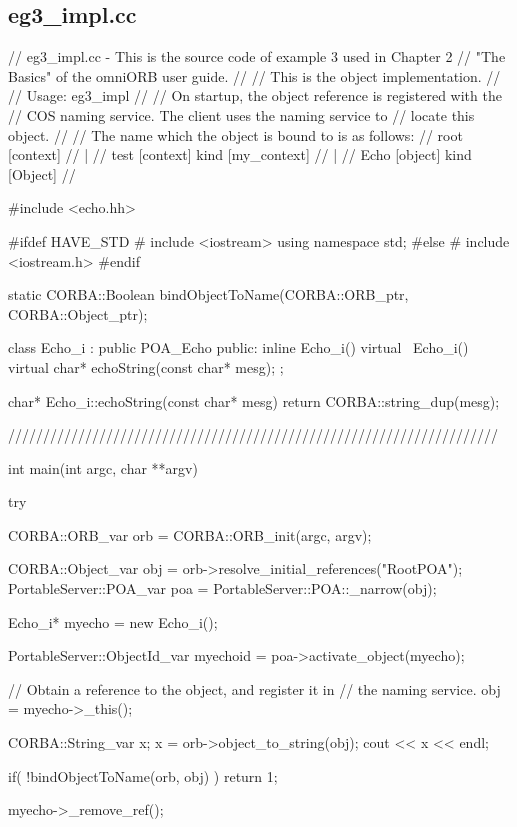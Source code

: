 \documentclass[11pt,twoside,a4paper]{book}
\begin{document}
\clearpage
\subsection{eg3\_impl.cc}

\begin{cxxlisting}
// eg3_impl.cc - This is the source code of example 3 used in Chapter 2
//               "The Basics" of the omniORB user guide.
//
//               This is the object implementation.
//
// Usage: eg3_impl
//
//        On startup, the object reference is registered with the
//        COS naming service. The client uses the naming service to
//        locate this object.
//
//        The name which the object is bound to is as follows:
//              root  [context]
//               |
//              test  [context] kind [my_context]
//               |
//              Echo  [object]  kind [Object]
//

#include <echo.hh>

#ifdef HAVE_STD
#  include <iostream>
   using namespace std;
#else
#  include <iostream.h>
#endif

static CORBA::Boolean bindObjectToName(CORBA::ORB_ptr, CORBA::Object_ptr);


class Echo_i : public POA_Echo
{
public:
  inline Echo_i() {}
  virtual ~Echo_i() {}
  virtual char* echoString(const char* mesg);
};


char* Echo_i::echoString(const char* mesg)
{
  return CORBA::string_dup(mesg);
}

//////////////////////////////////////////////////////////////////////

int
main(int argc, char **argv)
{
  try {
    CORBA::ORB_var orb = CORBA::ORB_init(argc, argv);

    CORBA::Object_var obj = orb->resolve_initial_references("RootPOA");
    PortableServer::POA_var poa = PortableServer::POA::_narrow(obj);

    Echo_i* myecho = new Echo_i();

    PortableServer::ObjectId_var myechoid = poa->activate_object(myecho);

    // Obtain a reference to the object, and register it in
    // the naming service.
    obj = myecho->_this();

    CORBA::String_var x;
    x = orb->object_to_string(obj);
    cout << x << endl;

    if( !bindObjectToName(orb, obj) )
      return 1;

    myecho->_remove_ref();

}}
\end{cxxlisting}
\end{document}
